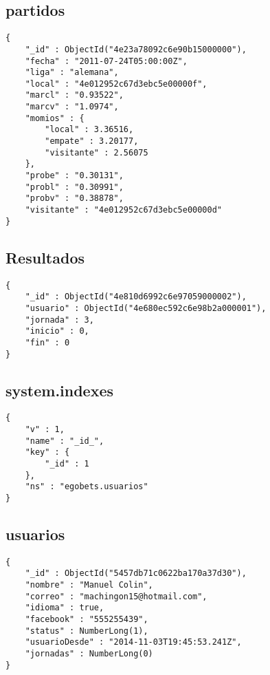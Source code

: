 \subsection{partidos}
\begin{lstlisting} 
{
	"_id" : ObjectId("4e23a78092c6e90b15000000"),
	"fecha" : "2011-07-24T05:00:00Z",
	"liga" : "alemana",
	"local" : "4e012952c67d3ebc5e00000f",
	"marcl" : "0.93522",
	"marcv" : "1.0974",
	"momios" : {
		"local" : 3.36516,
		"empate" : 3.20177,
		"visitante" : 2.56075
	},
	"probe" : "0.30131",
	"probl" : "0.30991",
	"probv" : "0.38878",
	"visitante" : "4e012952c67d3ebc5e00000d"
}

\end{lstlisting}

\subsection{Resultados}

\begin{lstlisting} 
{
	"_id" : ObjectId("4e810d6992c6e97059000002"),
	"usuario" : ObjectId("4e680ec592c6e98b2a000001"),
	"jornada" : 3,
	"inicio" : 0,
	"fin" : 0
} 
\end{lstlisting}

\subsection{system.indexes}
\begin{lstlisting} 
{
	"v" : 1,
	"name" : "_id_",
	"key" : {
		"_id" : 1
	},
	"ns" : "egobets.usuarios"
}
\end{lstlisting}

\subsection{usuarios}

\begin{lstlisting} 
{
	"_id" : ObjectId("5457db71c0622ba170a37d30"),
	"nombre" : "Manuel Colin",
	"correo" : "machingon15@hotmail.com",
	"idioma" : true,
	"facebook" : "555255439",
	"status" : NumberLong(1),
	"usuarioDesde" : "2014-11-03T19:45:53.241Z",
	"jornadas" : NumberLong(0)
} 
\end{lstlisting}




